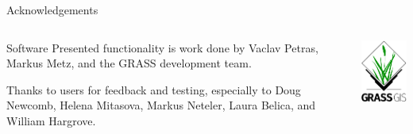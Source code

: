 \documentclass[xcolor={dvipsnames,usenames},beamer,aspectratio=43]{beamer}
\begin{document}
\begin{frame}{Acknowledgements}

\begin{columns}
\begin{column}{0.6\textwidth}

\begin{block}{Software}
Presented functionality is work done by Vaclav Petras, Markus Metz, and the GRASS development team.

\bigskip

Thanks to users for feedback and testing, especially to
Doug Newcomb, Helena Mitasova, Markus Neteler, Laura Belica, and William Hargrove.
\end{block}

\end{column}
\begin{column}{0.3\textwidth}

\begin{center}
  \includegraphics[width=\textwidth]{logos/grass_gis}
\end{center}

\end{column}
\end{columns}

\end{frame}
\end{document}
